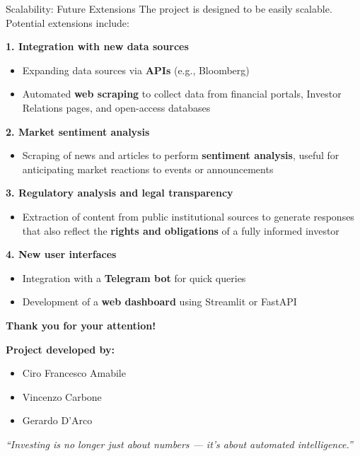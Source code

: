 \documentclass[aspectratio=169,xcolor=dvipsnames]{beamer}
\begin{document}
\begin{frame}{Scalability: Future Extensions}
  The project is designed to be easily scalable. Potential extensions include:
  
  \vspace{0.05cm}
  \textbf{1. Integration with new data sources}
  \begin{itemize}
      \item Expanding data sources via \textbf{APIs} (e.g., Bloomberg)
      \item Automated \textbf{web scraping} to collect data from financial portals, Investor Relations pages, and open-access databases
  \end{itemize}
  
  \textbf{2. Market sentiment analysis}
  \begin{itemize}
      \item Scraping of news and articles to perform \textbf{sentiment analysis}, useful for anticipating market reactions to events or announcements
  \end{itemize}
  
  \textbf{3. Regulatory analysis and legal transparency}
  \begin{itemize}
      \item Extraction of content from public institutional sources to generate responses that also reflect the \textbf{rights and obligations} of a fully informed investor
  \end{itemize}
  
  \textbf{4. New user interfaces}
  \begin{itemize}
      \item Integration with a \textbf{Telegram bot} for quick queries
      \item Development of a \textbf{web dashboard} using Streamlit or FastAPI
  \end{itemize}

\end{frame}

  

\begin{frame}

  \centering
  {\LARGE \textbf{Thank you for your attention!}}
  
  \vspace{0.8cm}
  
  \textbf{Project developed by:}
  
  \vspace{0.3cm}
  \begin{itemize}
      \item Ciro Francesco Amabile
      \item Vincenzo Carbone
      \item Gerardo D'Arco
  \end{itemize}
  
  \vspace{0.6cm}
  \textit{“Investing is no longer just about numbers — it's about automated intelligence.”}
  
  \end{frame}
  
\end{document}
